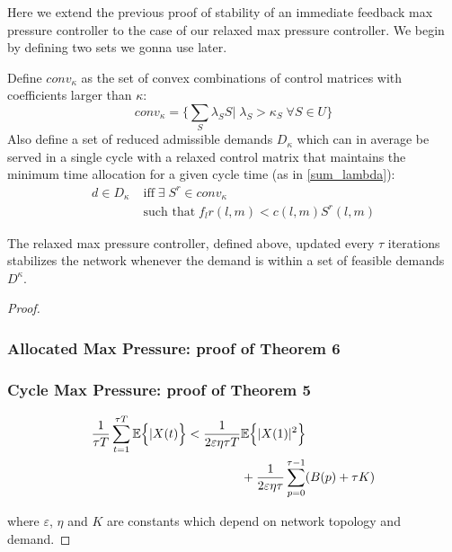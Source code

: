 Here we extend the previous proof of stability of an immediate feedback max pressure controller to the case of our relaxed max pressure controller.
We begin by defining two sets we gonna use later.

Define $conv_{\kappa}$ as the set of convex combinations of control matrices with coefficients larger than $\kappa$:
\begin{equation}
conv_{\kappa} = \Big\{ \sum_{S}\lambda_{S}S \big| \; \lambda_S > \kappa_S \; \forall S\in U\Big\}
\end{equation}
Also define a set of reduced admissible demands $D_{\kappa}$ which can in average be served in a single cycle with a relaxed control matrix that maintains the minimum time allocation for a given cycle time (as in \eqref{sum_lambda}):
\begin{align} \nonumber
d \in D_{\kappa} \; & \text{iff} \; \exists \; S^r \in conv_{\kappa} \; \\ & \text{such that} \; f_{l}r(l,m) < c(l,m)S^r(l,m)
\label{admissible_relaxed}
\end{align} 

\vspace{0.5cm}


\begin{Thm}\label{stabRelaxMP}
The relaxed max pressure controller, defined above, updated every $\tau$ iterations stabilizes the network whenever the demand is within a set of feasible demands $D^{\kappa}$.
\end{Thm}

\begin{proof}



%
%
\subsubsection*{Allocated Max Pressure: proof of Theorem 6}

\subsubsection*{Cycle Max Pressure: proof of Theorem 5}




\begin{align} \label{CYCLE_BOUNDS}
\dfrac{1}{\tau T} \displaystyle\sum_{t=1}^{\tau T} \expectation{\vert X(t)}< \dfrac{1}{2\varepsilon\eta\tau T}& \expectation{\vert X(1) \vert^{2}} \\ \nonumber
& + \dfrac{1}{2\varepsilon\eta\tau}\displaystyle\sum_{p=0}^{\tau - 1} (B(p) + \tau K)
\end{align}

where $\varepsilon$, $\eta$ and $K$ are constants which depend on network topology and demand.

\end{proof}

